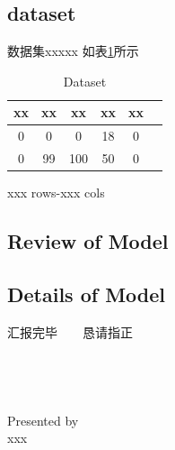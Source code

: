 \documentclass{ctexbeamer}
\begin{document}
\subsection{dataset}
\begin{frame}{数据集}{xxxxx}
如表\ref{tab1}所示
\begin{table}
\centering
\caption{Dataset}
\label{tab1}
\begin{tabular}{cccccc}
\toprule
xx & xx & xx & xx & xx  \\
\midrule
0 & 0 & 0 & 18 & 0   \\
0  & 99 & 100 & 50 & 0  \\

\bottomrule
\end{tabular}
\end{table}
xxx rows-xxx cols
\end{frame}

\subsection{Review of Model}

\subsection{Details of Model}




\begin{frame}
    \begin{center}
        汇报完毕~~~~恳请指正
        ~\\
        ~\\
        ~\\
        ~\\
        ~\\
        Presented by
        ~\\
        xxx
    \end{center}
\end{frame}
\end{document}
